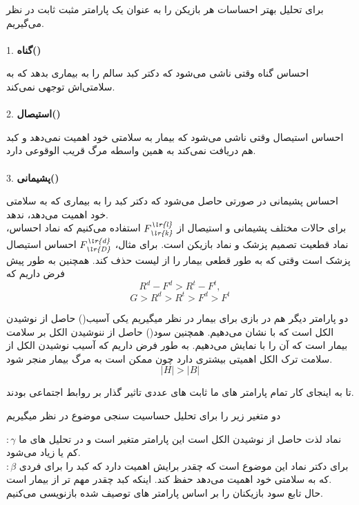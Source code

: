 \documentclass[12pt]{article}
\begin{document}
برای تحلیل بهتر احساسات هر بازیکن را به عنوان یک پارامتر مثبت ثابت در نظر می‌گیریم.\\
\\
1. \textbf{گناه() }

احساس گناه وقتی ناشی می‌شود که دکتر کبد سالم را به بیماری بدهد که به سلامتی‌اش توجهی نمی‌کند.\\
\\
2. \textbf{استیصال() }

احساس استیصال وقتی ناشی می‌شود که بیمار به سلامتی خود اهمیت نمی‌دهد و کبد هم دریافت نمی‌کند به همین واسطه مرگ قریب الوقوعی دارد.\\
\\
3. \textbf{پشیمانی() }

احساس پشیمانی در صورتی حاصل می‌شود که دکتر کبد را به بیماری که به سلامتی خود اهمیت می‌دهد، ندهد.
\\

برای حالات مختلف پشیمانی و استیصال از $F_{\textit{\lr{k}}}^{\textit{\lr{l}}}$ استفاده می‌کنیم که  نماد احساس،  نماد قطعیت تصمیم پزشک و  نماد بازیکن است.
برای مثال، $F_{\textit{\lr{D}}}^{\textit{\lr{d}}}$ احساس استیصال پزشک  است وقتی که به طور قطعی   بیمار را از لیست حذف کند.
همچنین به طور پیش فرض داریم که
\[
R^d - F^d > R^t - F^t ,
\]
\[
G > R^d > R^t > F^d > F^t 
\]

دو پارامتر دیگر هم در بازی برای بیمار در نظر میگیریم یکی آسیب() حاصل از نوشیدن الکل است که با  نشان می‌دهیم. همچنین سود() حاصل از ننوشیدن الکل بر سلامت بیمار است که آن را با  نمایش می‌دهیم.
به طور فرض داریم که آسیب نوشیدن الکل از سلامت ترک الکل اهمیتی بیشتری دارد چون ممکن است به مرگ بیمار منجر شود.
\[
|H| > |B|
\]

تا به اینجای کار تمام پارامتر های ما ثابت های عددی تاثیر گذار بر روابط اجتماعی بودند.

دو متغیر زیر را برای تحلیل حساسیت سنجی موضوع در نظر میگیریم

$ :\gamma$
نماد لذت حاصل از نوشیدن الکل است این پارامتر متغیر است و در تحلیل های ما کم یا زیاد می‌شود.\\

$ :\beta$
برای دکتر نماد این موضوع است که چقدر برایش اهمیت دارد که کبد را برای فردی که به سلامتی خود اهمیت می‌دهد حفظ کند. اینکه کبد چقدر مهم تر از بیمار است.\\

حال تابع سود بازیکنان را بر اساس پارامتر های توصیف شده بازنویسی می‌کنیم.
\end{document}
